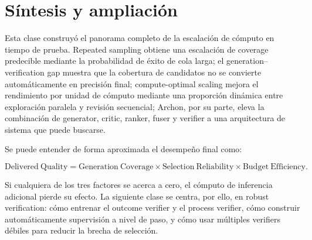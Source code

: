\section{Síntesis y ampliación}

Esta clase construyó el panorama completo de la escalación de cómputo en tiempo de prueba. Repeated sampling obtiene una escalación de coverage predecible mediante la probabilidad de éxito de cola larga; el generation--verification gap muestra que la cobertura de candidatos no se convierte automáticamente en precisión final; compute-optimal scaling mejora el rendimiento por unidad de cómputo mediante una proporción dinámica entre exploración paralela y revisión secuencial; Archon, por su parte, eleva la combinación de generator, critic, ranker, fuser y verifier a una arquitectura de sistema que puede buscarse.

Se puede entender de forma aproximada el desempeño final como:

$$
\mathrm{Delivered\ Quality}
=\mathrm{Generation\ Coverage}
\times\mathrm{Selection\ Reliability}
\times\mathrm{Budget\ Efficiency}.
$$

Si cualquiera de los tres factores se acerca a cero, el cómputo de inferencia adicional pierde su efecto. La siguiente clase se centra, por ello, en robust verification: cómo entrenar el outcome verifier y el process verifier, cómo construir automáticamente supervisión a nivel de paso, y cómo usar múltiples verifiers débiles para reducir la brecha de selección.



